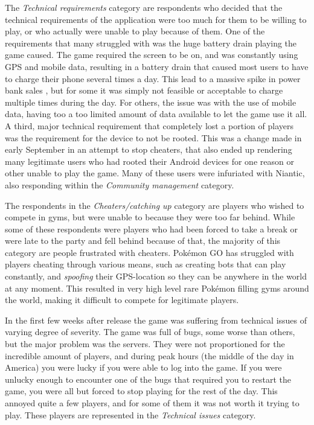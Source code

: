 The \emph{Technical requirements} category are respondents who decided that the technical requirements of the application were too much for them to be willing to play, or who actually were unable to play because of them. One of the requirements that many struggled with was the huge battery drain playing the game caused. The game required the screen to be on, and was constantly using GPS and mobile data, resulting in a battery drain that caused most users to have to charge their phone several times a day. This lead to a massive spike in power bank sales , but for some it was simply not feasible or acceptable to charge multiple times during the day. For others, the issue was with the use of mobile data, having too a too limited amount of data available to let the game use it all. A third, major technical requirement that completely lost a portion of players was the requirement for the device to not be rooted. This was a change made in early September in an attempt to stop cheaters, that also ended up rendering many legitimate users who had rooted their Android devices for one reason or other unable to play the game. Many of these users were infuriated with Niantic, also responding within the \emph{Community management} category.

The respondents in the \emph{Cheaters/catching up} category are players who wished to compete in gyms, but were unable to because they were too far behind. While some of these respondents were players who had been forced to take a break or were late to the party and fell behind because of that, the majority of this category are people frustrated with cheaters. Pokémon GO has struggled with players cheating through various means, such as creating bots that can play constantly, and \emph{spoofing} their GPS-location so they can be anywhere in the world at any moment. This resulted in very high level rare Pokémon filling gyms around the world, making it difficult to compete for legitimate players.

In the first few weeks after release the game was suffering from technical issues of varying degree of severity. The game was full of bugs, some worse than others, but the major problem was the servers. They were not proportioned for the incredible amount of players, and during peak hours (the middle of the day in America) you were lucky if you were able to log into the game. If you were unlucky enough to encounter one of the bugs that required you to restart the game, you were all but forced to stop playing for the rest of the day. This annoyed quite a few players, and for some of them it was not worth it trying to play. These players are represented in the \emph{Technical issues} category.

